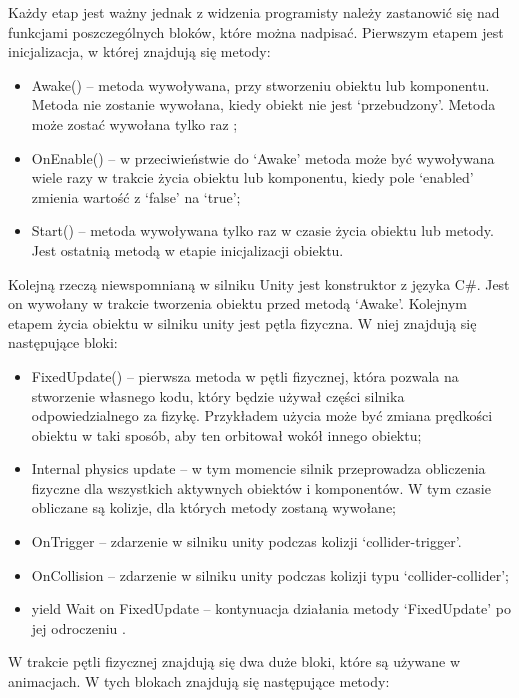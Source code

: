 \documentclass[12pt,twoside]{article}
\begin{document}
Każdy etap jest ważny jednak z widzenia programisty należy zastanowić się nad
funkcjami poszczególnych bloków, które można nadpisać. Pierwszym etapem jest
inicjalizacja, w której znajdują się metody:
\begin{itemize}
\item Awake() – metoda wywoływana, przy stworzeniu obiektu lub komponentu.
Metoda nie zostanie wywołana, kiedy obiekt nie jest ‘przebudzony’. Metoda może
zostać wywołana tylko raz \cite{Unity:Awake};
\item OnEnable() – w przeciwieństwie do ‘Awake’ metoda może być wywoływana wiele
razy w trakcie życia obiektu lub komponentu, kiedy pole ‘enabled’ zmienia
wartość z ‘false’ na ‘true’;
\item Start() – metoda wywoływana tylko raz w czasie życia obiektu lub metody.
Jest ostatnią metodą w etapie inicjalizacji obiektu. 
\end{itemize}
Kolejną rzeczą niewspomnianą w silniku Unity jest konstruktor z języka C\#. Jest
on wywołany w trakcie tworzenia obiektu przed metodą ‘Awake’. Kolejnym etapem
życia obiektu w silniku unity jest pętla fizyczna. W niej znajdują się
następujące bloki: 
\begin{itemize}
\item FixedUpdate() – pierwsza metoda w pętli fizycznej, która pozwala na
stworzenie własnego kodu, który będzie używał części silnika odpowiedzialnego za
fizykę. Przykładem użycia może być zmiana prędkości obiektu w taki sposób, aby
ten orbitował wokół innego obiektu; 
\item Internal physics update – w tym momencie silnik przeprowadza obliczenia
fizyczne dla wszystkich aktywnych obiektów i komponentów. W tym czasie obliczane
są kolizje, dla których metody zostaną wywołane;
\item OnTrigger – zdarzenie w silniku unity podczas kolizji ‘collider-trigger’. 
\item OnCollision – zdarzenie w silniku unity podczas kolizji typu
‘collider-collider’;
\item yield Wait on FixedUpdate – kontynuacja działania metody ‘FixedUpdate’ po
jej odroczeniu \cite{Unity:yield}.
\end{itemize}
W trakcie pętli fizycznej znajdują się dwa duże bloki, które są używane w
animacjach. W tych blokach znajdują się następujące metody:
\end{document}
